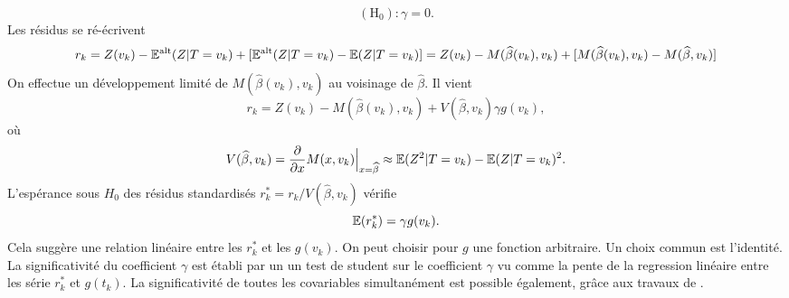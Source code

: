 $$
(\text{H}_0): \gamma = 0.
$$
Les résidus se ré-écrivent 
$$
r_k = Z(v_k) - \mathbb{E}^\text{alt}(Z|T = v_k) + [\mathbb{E}^\text{alt}(Z|T = v_k)-\mathbb{E}(Z|T = v_k)] = Z(v_k) - M(\widehat{\beta}(v_k), v_k) + [M(\widehat{\beta}(v_k), v_k)-M(\widehat{\beta}, v_k)]
$$
On effectue un développement limité de $M(\widehat{\beta}(v_k), v_k)$  au voisinage de $\widehat{\beta}$. Il vient 
$$
r_k = Z(v_k) - M(\widehat{\beta}(v_k), v_k) + V(\widehat{\beta}, v_k)\gamma g(v_k),
$$
où
$$
V(\widehat{\beta}, v_k) = \frac{\partial}{\partial x} M(x, v_k)\Big|_{x = \widehat{\beta}} \approx \mathbb{E}(Z^2|T = v_k) - \mathbb{E}(Z|T = v_k)^2.
$$
L'espérance sous $H_0$ des résidus standardisés $r_k^\ast  = r_k /V(\widehat{\beta}, v_k)$ vérifie 
$$
\mathbb{E}(r_k^\ast) = \gamma g(v_k).
$$
Cela suggère une relation linéaire entre les $r_k^\ast$ et les $g(v_k)$. On peut choisir pour $g$ une fonction arbitraire. Un choix commun est l'identité. La significativité du coefficient $\gamma$ est établi par un un test de student sur le coefficient $\gamma$ vu comme la pente de la regression linéaire entre les série $r_k^\ast$ et $g(t_k)$. La significativité de toutes les covariables simultanément est possible également, grâce aux travaux de \citet{GRAMBSCH1994}.


